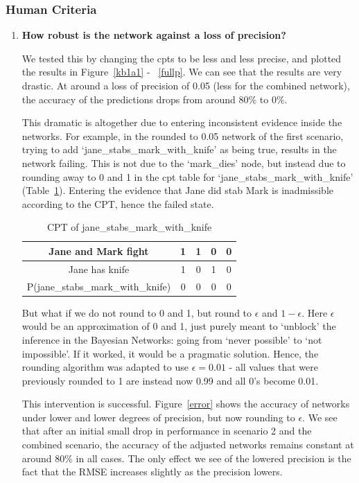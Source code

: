 \subsubsection{Human Criteria}
\begin{enumerate}


\item \textbf{How robust is the network against a loss of precision?}

We tested this by changing the cpts to be less and less precise, and plotted the results in Figure~\ref{kb1a1} - ~\ref{fullp}. We can see that the results are very drastic. At around a loss of precision of 0.05 (less for the combined network), the accuracy of the predictions drops from around 80\% to 0\%. 

This dramatic is altogether due to entering inconsistent evidence inside the networks. For example, in the rounded to 0.05 network of the first scenario, trying to add `jane\_stabs\_mark\_with\_knife' as being true, results in the network failing. This is not due to the `mark\_dies' node, but instead due to rounding away to 0 and 1 in the cpt table for `jane\_stabs\_mark\_with\_knife' (Table~\ref{stab}). Entering the evidence that Jane did stab Mark is inadmissible according to the CPT, hence the failed state.

\begin{table}
\begin{center}
\begin{tabular}{|c|c|c|c|c|}
 \hline
 Jane and Mark fight & 1 & 1 &0 & 0 \\
 \hline
 Jane has knife & 1 & 0 &1 & 0 \\
 \hline
 \hline
  P(jane\_stabs\_mark\_with\_knife) & 0 & 0 &0 & 0 \\
  \hline
\end{tabular}
\caption{CPT of jane\_stabs\_mark\_with\_knife}
\label{stab}
\end{center}
\end{table}

But what if we do not round to 0 and 1, but round to $\epsilon$ and $1 - \epsilon$. Here $\epsilon$ would be an approximation of 0 and 1, just purely meant to `unblock' the inference in the Bayesian Networks: going from `never possible' to `not impossible'. If it worked, it would be a pragmatic solution. Hence, the rounding algorithm was adapted to use $\epsilon = 0.01$ - all values that were previously rounded to 1 are instead now 0.99 and all 0's become 0.01.

This intervention is successful. Figure~\ref{error} shows the accuracy of networks under lower and lower degrees of precision, but now rounding to $\epsilon$. We see that after an initial small drop in performance in scenario 2 and the combined scenario, the accuracy of the adjusted networks remains constant at around 80\% in all cases. The only effect we see of the lowered precision is the fact that the RMSE increases slightly as the precision lowers.


\end{enumerate}
